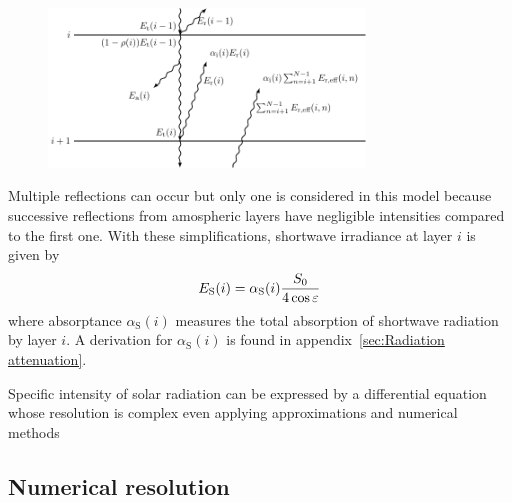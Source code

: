 \documentclass[a4paper,10pt,twocolumn,\classoptions]{article}
\begin{document}

\begin{figure}[h]
  \centering
  \includegraphics*[keepaspectratio=true,width=0.75\textwidth]{shortwave_radiation}
  \caption{} %
  \label{fig:shortwave_radiation}
\end{figure}
Multiple reflections can occur but only one is considered in this model because successive reflections from amospheric layers have negligible intensities compared to the first one.
With these simplifications, shortwave irradiance at layer $i$ is given by
\begin{equation}
  \label{eq:irradiance_shortwave}
  E_\text{S}(i) = \alpha_\text{S}(i) \frac{S_0}{4 \cos \varepsilon}
\end{equation}
where absorptance $\alpha_\text{S}(i)$ measures the total absorption of shortwave radiation by layer $i$. A derivation for $\alpha_\text{S}(i)$ is found in appendix~\ref{sec:Radiation attenuation}.


Specific intensity of solar radiation can be expressed by a differential equation whose resolution is complex even applying approximations and numerical methods



\subsection{Numerical resolution}
\label{sec:Numerical resolution}
\end{document}
